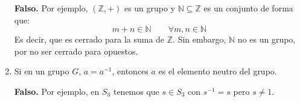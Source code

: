 \documentclass[12pt]{article}
\begin{document}
\begin{ejercicio}
\begin{enumerate}
                \textbf{Falso.} Por ejemplo, $(\mathbb{Z},+)$ es un grupo y $\mathbb{N}\subseteq \mathbb{Z}$ es un conjunto de forma que:
                \begin{equation*}
                    m+n \in \mathbb{N} \qquad \forall m,n\in \mathbb{N}
                \end{equation*}
                Es decir, que es cerrado para la suma de $\mathbb{Z}$. Sin embargo, $\mathbb{N}$ no es un grupo, por no ser cerrado para opuestos.

            \item Si en un grupo $G$, $a=a^{-1}$, entonces $a$ es el elemento neutro del grupo.
                
                \textbf{Falso.} Por ejemplo, en $S_3$ tenemos que $s\in S_3$ con $s^{-1} = s$ pero $s\neq 1$.
        \end{enumerate}
    \end{ejercicio}
\end{document}
